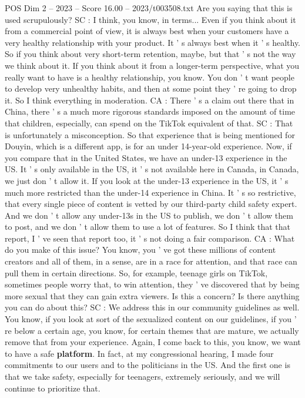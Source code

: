 \begin{textsample}{POS Dim 2 – 2023 – Score 16.00 – 2023/t003508.txt}
Are you saying that this is used scrupulously?
SC : I think, you know, in terms...
Even if you think about it from a commercial point of view, it is always best when your customers have a very healthy relationship with your product.
It ' s always best when it ' s healthy.
So if you think about very short-term retention, maybe, but that ' s not the way we think about it.
If you think about it from a longer-term perspective, what you really want to have is a healthy relationship, you know.
You don ' t want people to develop very unhealthy habits, and then at some point they ' re going to drop it.
So I think everything in moderation.
CA : There ' s a claim out there that in China, there ' s a much more rigorous standards imposed on the amount of time that children, especially, can spend on the TikTok equivalent of that.
SC : That is unfortunately a misconception.
So that experience that is being mentioned for Douyin, which is a different app, is for an under 14-year-old experience.
Now, if you compare that in the United States, we have an under-13 experience in the US.
It ' s only available in the US, it ' s not available here in Canada, in Canada, we just don ' t allow it.
If you look at the under-13 experience in the US, it ' s much more restricted than the under-14 experience in China.
It ' s so restrictive, that every single piece of content is vetted by our third-party child safety expert.
And we don ' t allow any under-13s in the US to publish, we don ' t allow them to post, and we don ' t allow them to use a lot of features.
So I think that that report, I ' ve seen that report too, it ' s not doing a fair comparison.
CA : What do you make of this issue?
You know, you ' ve got these millions of content creators and all of them, in a sense, are in a race for attention, and that race can pull them in certain directions.
So, for example, teenage girls on TikTok, sometimes people worry that, to win attention, they ' ve discovered that by being more sexual that they can gain extra viewers.
Is this a concern?
Is there anything you can do about this?
SC : We address this in our community guidelines as well.
You know, if you look at sort of the sexualized content on our guidelines, if you ' re below a certain age, you know, for certain themes that are mature, we actually remove that from your experience.
Again, I come back to this, you know, we want to have a safe \textbf{platform}.
In fact, at my congressional hearing, I made four commitments to our users and to the politicians in the US.
And the first one is that we take safety, especially for teenagers, extremely seriously, and we will continue to prioritize that.

\end{textsample}
